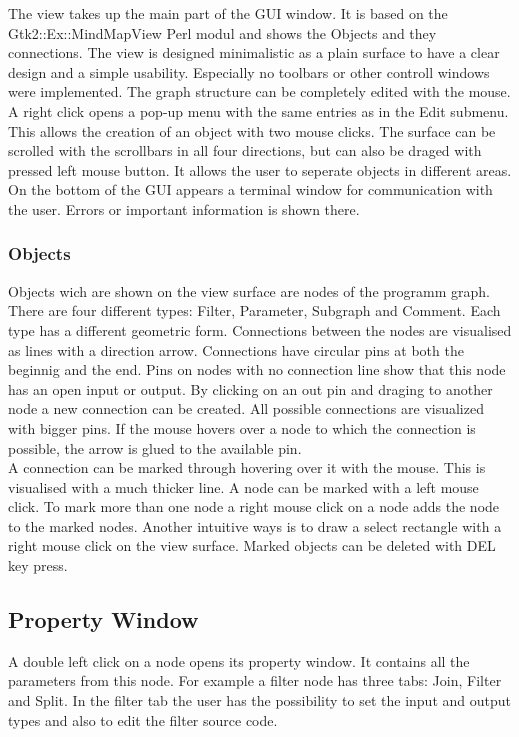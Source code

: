 \documentclass[journal]{IEEEtran}
\begin{document}
The view takes up the main part of the GUI window. It is based on the Gtk2::Ex::MindMapView
Perl modul \cite{GTK2EXMindMapView} and shows the Objects and they connections. The view is designed
minimalistic as a plain surface to have a clear design and a simple usability.
Especially no toolbars or other controll windows were implemented. The graph structure
can be completely edited with the mouse. A right click opens a pop-up menu with the
same entries as in the Edit submenu. This allows the creation of an object with two mouse
clicks. The surface can be scrolled with the scrollbars in all four directions,
but can also be draged with pressed left mouse button. It allows the user
to seperate objects in different areas. \\

On the bottom of the GUI appears a terminal window for communication with the user. 
Errors or important information is shown there. \\

\subsubsection{Objects}
Objects wich are shown on the view surface are nodes of the programm graph. There
are four different types: Filter, Parameter, Subgraph and Comment. Each type has
a different geometric form. Connections between the nodes are visualised as lines
with a direction arrow. Connections have circular pins at both the beginnig and the end.
Pins on nodes with no connection line show that this node has an open input or output. 
By clicking on an out pin and draging to another node a new connection can be created. 
All possible connections are visualized with bigger pins. If the mouse hovers over a 
node to which the connection is possible, the arrow is glued to the available pin. \\

A connection can be marked through hovering over it with the mouse. This is visualised with a much
thicker line. A node can be marked with a left mouse click. To mark more than one
node a right mouse click on a node adds the node to the marked nodes. Another intuitive
ways is to draw a select rectangle with a right mouse click on the view surface.
Marked objects can be deleted with DEL key press. \\

\subsection{Property Window}
A double left click on a node opens its property window. It contains all the parameters
from this node. For example a filter node has three tabs: Join, Filter and Split.
In the filter tab the user has the possibility to set the input and output types and
also to edit the filter source code.
\end{document}
